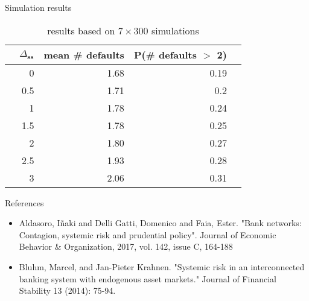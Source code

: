 \documentclass{beamer}
\begin{document}
\begin{frame}{Simulation results}
    
\begin{table}[ht]
    \centering
    \begin{tabular}{rrrrr}
      \hline
     & $\Delta_{\textbf{ss}}$ & mean \# defaults &  P(\# defaults $>$ 2) \\ 
      \hline
   & 0 & 1.68 & 0.19\\ 
   & 0.5 & 1.71 & 0.2\\ 
   & 1 & 1.78 & 0.24\\ 
   & 1.5 & 1.78 & 0.25\\ 
   & 2 & 1.80 & 0.27 \\ 
   & 2.5 & 1.93 & 0.28\\ 
   & 3 & 2.06 & 0.31\\ 
       \hline
    \end{tabular}
    \caption{results based on $7 \times 300$ simulations}
  \end{table}
  
\end{frame}


\begin{frame}{References}
    \begin{itemize}
        \item  Aldasoro, Iñaki and Delli Gatti, Domenico and Faia, Ester. "Bank networks: Contagion, systemic risk and prudential policy". Journal of Economic Behavior \& Organization, 2017, vol. 142, issue C, 164-188
        \item Bluhm, Marcel, and Jan-Pieter Krahnen. "Systemic risk in an interconnected banking system with endogenous asset markets." Journal of Financial Stability 13 (2014): 75-94.
    \end{itemize}

\end{frame}

    
\end{document}
